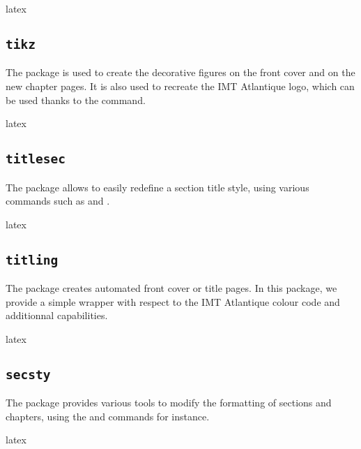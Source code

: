 \documentclass{report}
\begin{document}
\begin{imtaCode}{latex}
\RequirePackage{fancyhdr}
\end{imtaCode}


\subsection{\texttt{tikz}}
The  package is used to create the decorative figures on the front cover and on the new chapter pages. 
It is also used to recreate the IMT Atlantique logo, which can be used thanks to the  command.

\begin{imtaCode}{latex}
\RequirePackage{tikz}
\end{imtaCode}

\subsection{\texttt{titlesec}}
The  package allows to easily redefine a section title style, using various commands such as  and .

\begin{imtaCode}{latex}
\RequirePackage{titlesec}
\end{imtaCode}


\subsection{\texttt{titling}}
The  package creates automated front cover or title pages. 
In this package, we provide a simple wrapper with respect to the IMT Atlantique colour code and additionnal capabilities.

\begin{imtaCode}{latex}
\RequirePackage{titling}
\end{imtaCode}


\subsection{\texttt{secsty}}
The  package provides various tools to modify the formatting of sections and chapters, using the  and  commands for instance.

\begin{imtaCode}{latex}
\RequirePackage{secsty}
\end{imtaCode}
\end{document}
